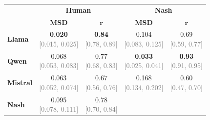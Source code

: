 \begin{tabular}{lcccc}
\toprule
& \multicolumn{2}{c}{\textbf{Human}} & \multicolumn{2}{c}{\textbf{Nash}} \\
\cmidrule(lr){2-3} \cmidrule(lr){4-5}
& \textbf{MSD} & $\boldsymbol{r}$ & \textbf{MSD} & $\boldsymbol{r}$ \\
\midrule
\textbf{Llama} &
  \shortstack{\rule{0pt}{12pt}\textbf{0.020} \\[3pt] {\small \textcolor{gray}{[0.015, 0.025]}}}
& \shortstack{\rule{0pt}{12pt}\textbf{0.84} \\[3pt] {\small \textcolor{gray}{[0.78, 0.89]}}}
& \shortstack{\rule{0pt}{12pt}0.104 \\[3pt] {\small \textcolor{gray}{[0.083, 0.125]}}}
& \shortstack{\rule{0pt}{12pt}0.69 \\[3pt] {\small \textcolor{gray}{[0.59, 0.77]}}} \\[4pt]
\textbf{Qwen} &
  \shortstack{\rule{0pt}{12pt}0.068 \\[3pt] {\small \textcolor{gray}{[0.053, 0.083]}}}
& \shortstack{\rule{0pt}{12pt}0.77 \\[3pt] {\small \textcolor{gray}{[0.68, 0.83]}}}
& \shortstack{\rule{0pt}{12pt}\textbf{0.033} \\[3pt] {\small \textcolor{gray}{[0.025, 0.041]}}}
& \shortstack{\rule{0pt}{12pt}\textbf{0.93} \\[3pt] {\small \textcolor{gray}{[0.91, 0.95]}}} \\[4pt]
\textbf{Mistral} &
  \shortstack{\rule{0pt}{12pt}0.063 \\[3pt] {\small \textcolor{gray}{[0.052, 0.074]}}}
& \shortstack{\rule{0pt}{12pt}0.67 \\[3pt] {\small \textcolor{gray}{[0.56, 0.76]}}}
& \shortstack{\rule{0pt}{12pt}0.168 \\[3pt] {\small \textcolor{gray}{[0.134, 0.202]}}}
& \shortstack{\rule{0pt}{12pt}0.60 \\[3pt] {\small \textcolor{gray}{[0.47, 0.70]}}} \\[4pt]
\midrule
\textbf{Nash} &
  \shortstack{\rule{0pt}{12pt}0.095 \\[3pt] {\small \textcolor{gray}{[0.078, 0.111]}}}
& \shortstack{\rule{0pt}{12pt}0.78 \\[3pt] {\small \textcolor{gray}{[0.70, 0.84]}}} \\[4pt]
\bottomrule
\end{tabular}
